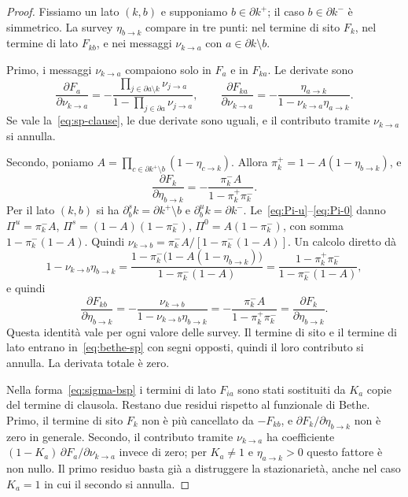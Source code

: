 \begin{proof}
Fissiamo un lato $(k,b)$ e supponiamo $b\in\partial k^+$; il caso $b\in\partial k^-$ è simmetrico.
La survey $\eta_{b\to k}$ compare in tre punti: nel termine di sito $F_k$, nel termine di lato $F_{kb}$, e nei messaggi $\nu_{k\to a}$ con $a\in\partial k\setminus b$.

Primo, i messaggi $\nu_{k\to a}$ compaiono solo in $F_a$ e in $F_{ka}$.
Le derivate sono
\begin{equation*}
\frac{\partial F_a}{\partial\nu_{k\to a}}=-\frac{\prod_{j\in\partial a\setminus k}\nu_{j\to a}}{1-\prod_{j\in\partial a}\nu_{j\to a}},\qquad
\frac{\partial F_{ka}}{\partial\nu_{k\to a}}=-\frac{\eta_{a\to k}}{1-\nu_{k\to a}\eta_{a\to k}}.
\end{equation*}
Se vale la~\eqref{eq:sp-clause}, le due derivate sono uguali, e il contributo tramite $\nu_{k\to a}$ si annulla.

Secondo, poniamo $A=\prod_{c\in\partial k^+\setminus b}(1-\eta_{c\to k})$.
Allora $\pi_k^+=1-A(1-\eta_{b\to k})$, e
\begin{equation*}
\frac{\partial F_k}{\partial\eta_{b\to k}}=-\frac{\pi_k^-A}{1-\pi_k^+\pi_k^-}.
\end{equation*}
Per il lato $(k,b)$ si ha $\partial^s_bk=\partial k^+\setminus b$ e $\partial^u_bk=\partial k^-$.
Le~\eqref{eq:Pi-u}--\eqref{eq:Pi-0} danno $\Pi^u=\pi_k^-A$, $\Pi^s=(1-A)(1-\pi_k^-)$, $\Pi^0=A(1-\pi_k^-)$, con somma $1-\pi_k^-(1-A)$.
Quindi $\nu_{k\to b}=\pi_k^-A/[1-\pi_k^-(1-A)]$.
Un calcolo diretto dà
\begin{equation*}
1-\nu_{k\to b}\eta_{b\to k}=\frac{1-\pi_k^-\bigl(1-A(1-\eta_{b\to k})\bigr)}{1-\pi_k^-(1-A)}=\frac{1-\pi_k^+\pi_k^-}{1-\pi_k^-(1-A)},
\end{equation*}
e quindi
\begin{equation*}
\frac{\partial F_{kb}}{\partial\eta_{b\to k}}=-\frac{\nu_{k\to b}}{1-\nu_{k\to b}\eta_{b\to k}}=-\frac{\pi_k^-A}{1-\pi_k^+\pi_k^-}=\frac{\partial F_k}{\partial\eta_{b\to k}}.
\end{equation*}
Questa identità vale per ogni valore delle survey.
Il termine di sito e il termine di lato entrano in~\eqref{eq:bethe-sp} con segni opposti, quindi il loro contributo si annulla.
La derivata totale è zero.

Nella forma~\eqref{eq:sigma-bsp} i termini di lato $F_{ia}$ sono stati sostituiti da $K_a$ copie del termine di clausola.
Restano due residui rispetto al funzionale di Bethe.
Primo, il termine di sito $F_k$ non è più cancellato da $-F_{kb}$, e $\partial F_k/\partial\eta_{b\to k}$ non è zero in generale.
Secondo, il contributo tramite $\nu_{k\to a}$ ha coefficiente $(1-K_a)\,\partial F_a/\partial\nu_{k\to a}$ invece di zero; per $K_a\neq1$ e $\eta_{a\to k}>0$ questo fattore è non nullo.
Il primo residuo basta già a distruggere la stazionarietà, anche nel caso $K_a=1$ in cui il secondo si annulla.
\end{proof}

